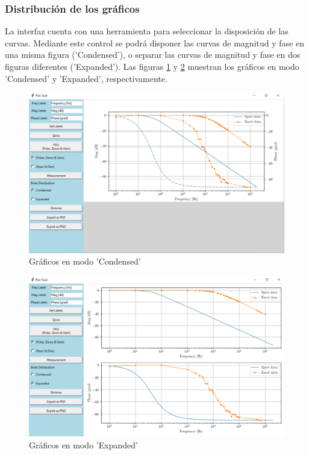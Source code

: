 \subsubsection{Distribución de los gráficos}
La interfaz cuenta con una herramienta para seleccionar la disposición de las curvas. Mediante este control se podrá disponer las curvas de magnitud y fase en una misma figura ('Condensed'), o separar las curvas de magnitud y fase en dos figuras diferentes ('Expanded'). Las figuras \ref{fig:condensed} y \ref{fig:expanded} muestran los gráficos en modo 'Condensed' y 'Expanded', respectivamente.

\begin{figure}[ht]
\centering
\includegraphics[scale=0.15]{resources/condensed.png}
\caption{Gráficos en modo 'Condensed'}
\label{fig:condensed}
\end{figure}

\begin{figure}[ht]
\centering
\includegraphics[scale=0.15]{resources/expanded.png}
\caption{Gráficos en modo 'Expanded'}
\label{fig:expanded}
\end{figure}

